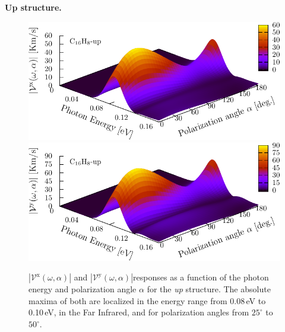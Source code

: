 \documentclass[prb,11pt,tightenlines,twocolumn,aps]{revtex4-1}
\begin{document}
\textbf{Up structure.}
\begin{figure}[t]
    \centering
    \includegraphics[width=\linewidth]{upplots/up-3d-vxb-1}
    \label{fig:up-3d-vvx-1}
    \\
    \includegraphics[width=\linewidth]{upplots/up-3d-vyb-1}
    \label{fig:up-3d-vvy-1}
    
    \caption{ $|\mathcal{V}^{\mathrm{x}}(\omega,\alpha)|$ and
    $|\mathcal{V}^{\mathrm{y}}(\omega,\alpha)|$responses as a function of the
    photon energy and polarization angle $\alpha$ for the \emph{up} structure.
    The absolute maxima of both are localized in the energy range from 0.08\,eV
    to 0.10\,eV, in the Far  Infrared, and for polarization angles from
    $25^{\circ}$ to $50^{\circ}$.}
    \label{fig:up-3d-vva-1}
\end{figure}
\end{document}
